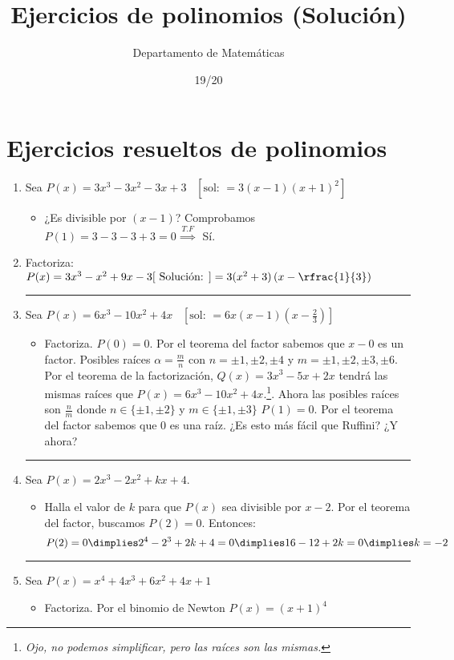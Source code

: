 \documentclass[palatino,nochap]{Docencia}
\title{Ejercicios de polinomios (Solución)}
\author{Departamento de Matemáticas}
\date{19/20}
\begin{document}
\section{Ejercicios resueltos de polinomios}

\begin{enumerate}

\item Sea $P(x) = 3x^3-3x^2-3x+3 \;\;\; [\text{sol: } = 3(x-1)(x+1)^2]$
\begin{itemize}
	\item ¿Es divisible por $(x-1)$? Comprobamos $P(1) = 3-3-3+3 = 0 \overset{T.F}{\implies}$ Sí.
\end{itemize}

\item Factoriza: $P(x) = 3x^3-x^2+9x-3 [\text{ Solución: }] = 3(x^2+3)\left(x-\rfrac{1}{3}\right)$
\hrule



\item Sea $P(x) = 6x^3-10x^2+4x \;\;\; [\text{sol: } = 6x(x-1)(x-\frac{2}{3})]$
\begin{itemize}
	\item Factoriza.
	\subitem $P(0) = 0$. Por el teorema del factor sabemos que $x-0$ es un factor.
	\subitem Posibles raíces $α=\frac{m}{n}$ con $n=±1,\pm2,\pm4$ y $m=\pm1,\pm2,\pm3,\pm6$.	
	\subitem Por el teorema de la factorización, $Q(x) = 3x^3-5x+2x$ tendrá las mismas raíces que $P(x) = 6x^3-10x^2+4x$.\footnote{\textit{Ojo, no podemos simplificar, pero las raíces son las mismas.}}. Ahora las posibles raíces son $\frac{n}{m}$ donde $n\in\{\pm1,\pm2\}$ y $m\in\{\pm1,\pm3\}$
	\subitem $P(1) = 0$. Por el teorema del factor sabemos que $0$ es una raíz. ¿Es esto más fácil que Ruffini? ¿Y ahora?
\end{itemize}

\hrule

\item Sea $P(x) = 2x^3-2x^2+kx+4$.
\begin{itemize}
	\item Halla el valor de $k$ para que $P(x)$ sea divisible por $x-2$.
	\subitem Por el teorema del factor, buscamos $P(2) = 0$. Entonces:
	\[
		P(2) = 0 \dimplies 2^4-2^3+2k+4 = 0 \dimplies 16-12+2k = 0 \dimplies k = -2
	\]
\end{itemize}


\hrule

\item Sea $P(x) = x^4+4x^3+6x^2+4x+1$
\begin{itemize}
	\item Factoriza.
	\subitem Por el binomio de Newton $P(x) = (x+1)^4$
\end{itemize}


\end{enumerate}
\end{document}
